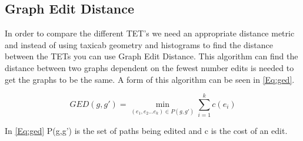 \subsection{Graph Edit Distance}\label{Subsec:GED}
In order to compare the different TET's we need an appropriate distance metric and instead of using taxicab geometry and histograms to find the distance between the TETs you can use Graph Edit Distance. This algorithm can find the distance between two graphs dependent on the fewest number edits is needed to get the graphs to be the same. A form of this algorithm can be seen in \autoref{Eq:ged}.

\begin{equation}\label{Eq:ged}
 GED(g,g') = \min_{(e_1,e_2 \dots e_k) \in P(g, g') } \sum_{i=1}^k c(e_i)
\end{equation}

In \autoref{Eq:ged} P(g,g') is the set of paths being edited and c is the cost of an edit. 